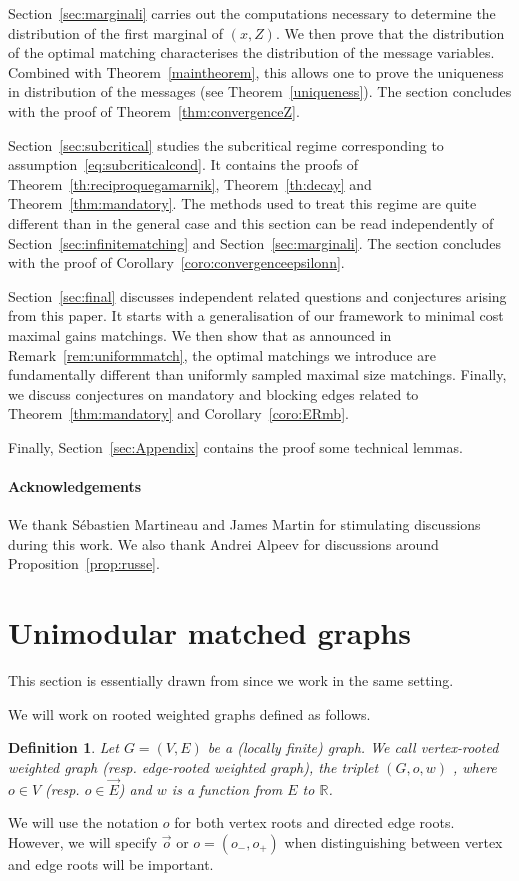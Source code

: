\documentclass[11pt]{article}
\newtheorem{definition}[prop]{Definition}
\begin{document}
Section~\ref{sec:marginali} carries out the computations necessary to determine the distribution of the first marginal of $(x,Z)$. 
We then prove that the distribution of the optimal matching characterises the distribution of the message variables. Combined with Theorem~\ref{maintheorem}, this allows one to prove the uniqueness in distribution of the messages (see Theorem~\ref{uniqueness}). The section concludes with the proof of Theorem~\ref{thm:convergenceZ}.

Section~\ref{sec:subcritical} studies the subcritical regime corresponding to assumption~\eqref{eq:subcriticalcond}. It contains the proofs of Theorem~\ref{th:reciproquegamarnik}, Theorem~\ref{th:decay} and Theorem~\ref{thm:mandatory}. The methods used to treat this regime are quite different than in the general case and this section can be read independently of Section~\ref{sec:infinitematching} and Section~\ref{sec:marginali}. The section concludes with the proof of Corollary~\ref{coro:convergenceepsilonn}.

Section~\ref{sec:final} discusses independent related questions and conjectures arising from this paper. It starts with a generalisation of our framework to minimal cost maximal gains matchings. We then show that as announced in Remark~\ref{rem:uniformmatch}, the optimal matchings we introduce are fundamentally different than uniformly sampled maximal size matchings. Finally, we discuss conjectures on mandatory and blocking edges related to Theorem~\ref{thm:mandatory} and Corollary~\ref{coro:ERmb}.

Finally, Section~\ref{sec:Appendix} contains the proof some technical lemmas.

\paragraph{Acknowledgements}
We thank Sébastien Martineau and James Martin for stimulating discussions during this work. We also thank Andrei Alpeev for discussions around Proposition~\ref{prop:russe}.

\section{Unimodular matched graphs}\label{sec:def}

This section is essentially drawn from \cite{enriquez2024optimalunimodularmatching} since we work in the same setting. 

We will work on rooted weighted graphs defined as follows.
\begin{definition}
     Let $G=(V,E)$ be a (locally finite) graph.
     We call \emph{vertex-rooted weighted graph} (resp. \emph{edge-rooted weighted graph}), the triplet $(G,o,w)$ , where $o \in V$ (resp. $o\in \overset{\rightarrow}{E}$) and $w$ is a function from $E$ to $\mathbb{R}$.
\end{definition}
\begin{remark}
We will use the notation $o$ for both vertex roots and directed edge roots. However, we will specify $\overset{\rightarrow}{o}$ or $o=(o_-,o_+)$ when distinguishing between vertex and edge roots will be important.
\end{remark}
\end{document}

